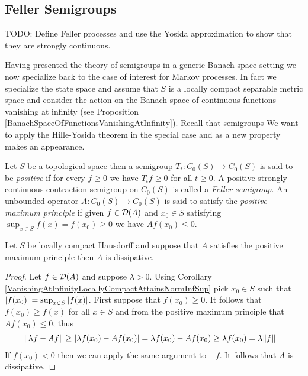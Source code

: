 \subsection{Feller Semigroups}

TODO: Define Feller processes and use the Yosida approximation to show that they are strongly continuous.

Having presented the theory of semigroups in a generic Banach space setting we now specialize back to the case of interest for Markov processes.  In fact we specialize the state space and assume that $S$ is a locally compact separable metric space and consider the action on the Banach space of continuous functions vanishing at infinity (see Proposition 
\ref{BanachSpaceOfFunctionsVanishingAtInfinity}).  Recall that semigroups We want to apply the Hille-Yosida theorem  in the special case and as a new property makes an appearance.

\begin{defn}Let $S$ be a topological space then a semigroup $T_t : C_0(S) \to C_0(S)$ is said to be \emph{positive} if for every $f \geq 0$ we have $T_t f \geq 0$ for all $t \geq 0$. 
A positive strongly continuous contraction semigroup on $C_0(S)$ is called a \emph{Feller semigroup}.   An unbounded operator $A : C_0(S) \to C_0(S)$ is said to satisfy the \emph{positive maximum principle} if given $f \in \mathcal{D}(A)$ and $x_0 \in S$ satisfying $\sup_{x \in S} f(x) = f(x_0) \geq 0$ we have $Af(x_0) \leq 0$.
\end{defn}


\begin{lem}\label{PositiveMaximumPrincipleDissipative}Let $S$ be locally compact Hausdorff and suppose that $A$ satisfies the positive maximum principle then $A$ is dissipative.
\end{lem}
\begin{proof}
Let $f \in \mathcal{D}(A)$ and suppose $\lambda > 0$.  Using Corollary \ref{VanishingAtInfinityLocallyCompactAttainsNormInfSup} pick $x_0 \in S$  such that $\left \vert f(x_0) \right \vert = \sup_{x \in S} \left \vert f(x) \right \vert$.  First suppose that $f(x_0) \geq 0$.  It follows that $f(x_0) \geq f(x)$ for all $x \in S$ and from the positive maximum principle that $Af(x_0) \leq 0$, thus
\begin{align*}
\lVert \lambda f - A f \rVert &\geq \left \vert \lambda f(x_0) - Af(x_0) \right \vert = \lambda f(x_0) - Af(x_0) \geq \lambda f(x_0) = \lambda \lVert f \rVert
\end{align*}
If $f(x_0) < 0$ then we can apply the same argument to $-f$.  It follows that $A$ is dissipative.
\end{proof}

